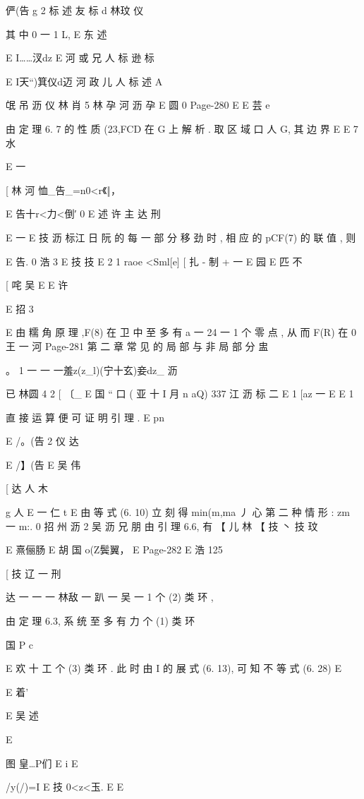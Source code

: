 {{{{{{{{{{{{{{俨(告 g 2 标 述 友 标 d 林玟 仪

其 中 0 一 1 L,
E 东 述

E I……汊dz E 河 或 兄 人 标 逊 标

E I天“)箕仪d迈 河 政 儿 人 标 述 A

氓 吊 沥 仪 林 肖 5 林 孕 河 沥 孕
E 圆 0
Page-280
E E 芸 e

由 定 理 6. 7 的 性 质 (23,FCD 在 G 上 解 析 . 取 区 域 口 人 G, 其 边 界
E
E 7 水

E
一

[ 林 河 恤_告_=n0<r《‖，

E 告十r<力<倒′
0
E 述 许 主 达 刑

E 一
E 技 沥 标江 日 阮
的 每 一 部 分 移 劲 时 , 相 应 的 pCF(7) 的 联 值 , 则

E 告. 0 浩 3
E 技 技
E 2 1
raoe <Sml[e] [ 扎 - 制 + 一
E 园
E 匹 不

[ 咤 吴
E
E 许

E 招 3

E
由 糯 角 原 理 ,F(8) 在 卫 中 至 多 有 a 一 24 一 1 个 零 点 , 从 而 F(R) 在
0 王 一 河
Page-281
第 二 章 常 见 的 局 部 与 非 局 部 分 盅

。 1 一 一
一羞z(z_l)(宁十玄)妾dz_ 沥

已 林圆 4 2
[ 〔_ E 国
“ 口 ( 亚 十 I
月 n aQ) 337
江 沥 标 二 E
1 [az 一 E E 1

直 接 运 算 便 可 证 明 引 理 .
E pn

E /。(告 2 仪 达

E /】(告 E 吴 伟

[ 达 人 木

g 人
E 一 仁
t
E
由 等 式 (6. 10) 立 刻 得 min(m,ma 丿 心
第 二 种 情 形 : zm 一 m:.
0 招 州 沥
2 吴 沥 兄 朋
由 引 理 6.6, 有
【 儿 林
【 技 丶 技
玟

E 熹俪肠 E 胡
国 o(Z鬓翼， E
Page-282
E 浩 125

[ 技 辽 一 刑

达 一 一 一 林敌
一
趴 一 吴 一 1 个 (2) 类 环 ,

由 定 理 6.3, 系 统 至 多 有 力 个 (1) 类 环

国 P
c

E
欢 十 工 个 (3) 类 环 . 此 时 由 I 的 展 式 (6. 13), 可 知 不 等 式 (6. 28)
E

E 着'

E 吴
述

E

图 皇…P们 E i
E

/y(/)=I E 技 0<z<玉.
E E

}}}}}}}}}}}}}}
